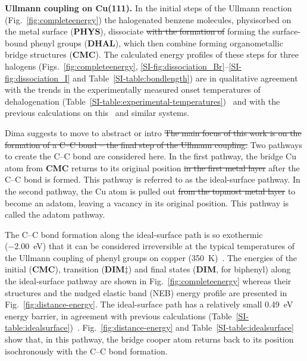 \documentclass[aps,prb,amsmath,amssymb,11pt]{revtex4-1}
\newcommand{\zhzh}{\color{blue}}
\begin{document}
\textbf{Ullmann coupling on Cu(111).}
%
In the initial steps of the Ullmann reaction (Fig.~\ref{fig:completeenergy}) the halogenated benzene molecules, physisorbed on the metal surface (\textbf{PHYS}), dissociate \sout{with the formation of} {\zhzh forming} the surface-bound phenyl groups (\textbf{DHAL}), which then combine forming organometallic bridge structures (\textbf{CMC}).
The calculated energy profiles of these steps for three halogens (Figs.~\ref{fig:completeenergy}, \ref{SI-fig:dissociation_Br}--\ref{SI-fig:dissociation_I} and Table~\ref{SI-table:bondlength}) are in qualitative agreement with the trends in the experimentally measured onset temperatures of dehalogenation (Table~\ref{SI-table:experimental-temperatures})~\cite{ullmann_52,ullmann_87,ullmann_67} and with the previous calculations on this~\cite{jacs2013,ullmann_88} and similar systems. 

{\zhzh Dima suggests to move to abstract or intro} \sout{The main focus of this work is on the formation of a C--C bond -- the final step of the Ullmann coupling.} 
Two pathways to create the C--C bond are considered here. 
In the first pathway, the bridge Cu atom {\zhzh from \textbf{CMC}} returns to its original position \sout{in the first metal layer} after the C--C bond is formed. This pathway is referred to as the ideal-surface pathway.
In the second pathway, the Cu atom is pulled out \sout{from the topmost metal layer} to become an adatom, leaving a vacancy in its original position. This pathway is called the adatom pathway.

The C--C bond formation along the ideal-surface path is so exothermic (\SI{-2.00}{\electronvolt}) that it can be considered irreversible at the typical temperatures of the Ullmann coupling of phenyl groups on copper (\SI{350}{\kelvin})~\cite{ullmann_67, sur_sci01}. The energies of the initial (\textbf{CMC}), transition (\textbf{DIM$\ddagger$}) and final states (\textbf{DIM}, for biphenyl) along the ideal-surface pathway are shown in Fig.~\ref{fig:completeenergy} whereas their structures and the nudged elastic band (NEB) energy profile are presented in Fig.~\ref{fig:distance-energy}. 
The ideal-surface path has a relatively small \SI{0.49}{\electronvolt} energy barrier, in agreement with previous calculations (Table~\ref{SI-table:idealsurface})~\cite{pccp2010, jacs2013}. %
Fig.~\ref{fig:distance-energy} and Table~\ref{SI-table:idealsurface} show that, in this pathway, the bridge cooper atom returns back to its position isochronously with the C--C bond formation. 
\end{document}
